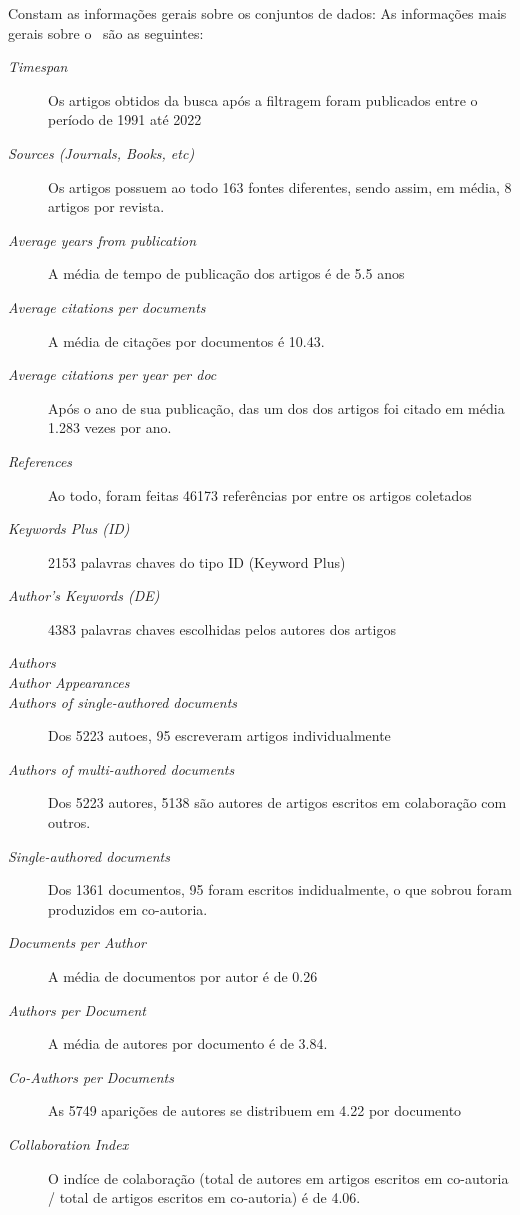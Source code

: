 Constam as informações gerais sobre os conjuntos de dados:
As informações mais gerais sobre o \dataset\   são as seguintes:
\begin{description}
    \item [\textit{Timespan}] Os artigos obtidos da busca após a filtragem foram publicados entre o período de 1991 até 2022
    \item [\textit{Sources (Journals, Books, etc)}] Os artigos possuem ao todo 163 fontes diferentes, sendo assim, em média, 8 artigos por revista.
    \item [\textit{Average years from publication}] A média de tempo de publicação dos artigos é de 5.5 anos
    \item [\textit{Average citations per documents}] A média de citações por documentos é 10.43.
    \item [\textit{Average citations per year per doc}] Após o ano de sua publicação, das um dos dos artigos foi citado em média 1.283 vezes por ano.
    \item [\textit{References}] Ao todo, foram feitas 46173  referências por entre os artigos coletados
    \item [\textit{Keywords Plus (ID)}] 2153 palavras chaves do tipo ID (Keyword Plus)
    \item [\textit{Author's Keywords (DE)}]  4383 palavras chaves escolhidas pelos autores dos artigos

    \item [\textit{Authors}]  
    \item [\textit{Author Appearances}] 
    \item [\textit{Authors of single-authored documents}] Dos 5223 autoes, 95 escreveram artigos individualmente
    \item [\textit{Authors of multi-authored documents}] Dos 5223 autores, 5138 são autores de artigos escritos em colaboração com outros.
    \item [\textit{Single-authored documents}] Dos 1361 documentos, 95 foram escritos indidualmente, o que sobrou foram produzidos em co-autoria.
    \item [\textit{Documents per Author}] A média de documentos por autor é de 0.26
    \item [\textit{Authors per Document}] A média de autores por documento é de 3.84.
    \item [\textit{Co-Authors per Documents}] As 5749 aparições de autores se distribuem em 4.22 por documento
    \item [\textit{Collaboration Index}] O indíce de colaboração (total de autores em artigos escritos em co-autoria / total de artigos escritos em co-autoria) é de 4.06.
\end{description}

